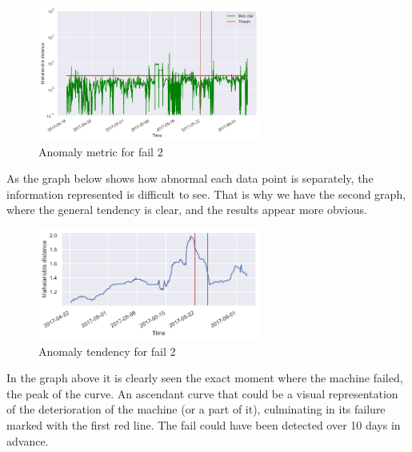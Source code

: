 \documentclass[11pt,twoside]{article}
\begin{document}
\begin{figure}[h!]
\centering
\includegraphics[width=0.65\textwidth]{6_1_AM_label.png}
\caption{Anomaly metric for fail 2}\label{screenshots}
\end{figure}
As the graph below shows how abnormal each data point is separately, the information represented
is difficult to see. That is why we have the second graph, where the general tendency is clear, 
and the results appear more obvious.

\begin{figure}[h!]
\centering
\includegraphics[width=0.65\textwidth]{6_1_T_label.png}
\caption{Anomaly tendency for fail 2}\label{screenshots}
\end{figure}
In the graph above it is clearly seen the exact moment where the machine failed, the peak of 
the curve. An ascendant curve that could be a visual representation of the deterioration of 
the machine (or a part of it), culminating in its failure marked with the first red line. The
fail could have been detected over 10 days in advance.
\end{document}

